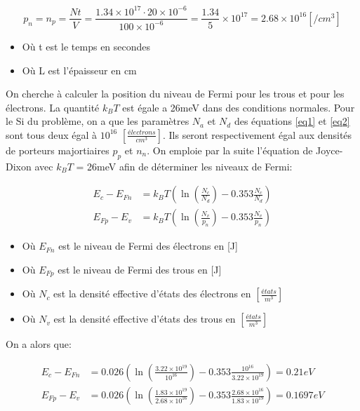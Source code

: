 \begin{equation}
\label{eq11}
p_n = n_p = \frac{N t}{V} = \frac{1.34\times 10^{17} \cdot 20 \times 10^{-6} }{100 \times 10^{-6}} = \frac{1.34}{5} \times 10^{17} = 2.68 \times 10^{16}\left[/cm^3\right]
\end{equation}
\begin{itemize}
\item Où t est le temps en secondes
\item Où L est l'épaisseur en cm
\end{itemize}



On cherche à calculer la position du niveau de Fermi pour les trous et pour les électrons. La quantité $k_B T$ est égale a 26meV dans des conditions normales. Pour le Si du problème, on a que les paramètres $N_a$ et $N_d$ des équations \ref{eq1} et \ref{eq2} sont tous deux égal à $10^{16}$ $\left[\frac{électrons}{cm^3}\right]$. Ils seront respectivement égal aux densités de porteurs majortiaires $p_p$ et $n_n$. On emploie par la suite l'équation de Joyce-Dixon avec $k_B T$ = 26meV afin de déterminer les niveaux de Fermi:

\begin{align}
\label{eq1}
E_{c} - E_{Fn} &= k_B T\left(\ln\left(\frac{N_c}{N_d}\right) - 0.353 \frac{N_c}{N_d}\right)\\
\label{eq2}
E_{Fp} - E_{v} &= k_B T\left(\ln\left(\frac{N_v}{p_n}\right) - 0.353 \frac{N_v}{p_n}\right)
\end{align}
\begin{itemize}
\item Où $E_{Fn}$ est le niveau de Fermi des électrons en [J]
\item Où $E_{Fp}$ est le niveau de Fermi des trous en [J]
\item Où $N_c$ est la densité effective d'états des électrons en $\left[\frac{états}{m^3}\right]$
\item Où $N_v$ est la densité effective d'états des trous en $\left[\frac{états}{m^3}\right]$
\end{itemize}

On a alors que:

\begin{align}
E_{c} - E_{Fn} &= 0.026\left(\ln\left(\frac{3.22\times 10^{19}}{10^{16}}\right) - 0.353 \frac{10^{16}}{3.22\times 10^{19}}\right) = 0.21eV\\
E_{Fp} - E_v   &= 0.026\left(\ln\left(\frac{1.83\times 10^{19}}{2.68 \times 10^{16}}\right) - 0.353 \frac{2.68 \times 10^{16}}{1.83\times 10^{19}}\right) = 0.1697eV
\end{align}

